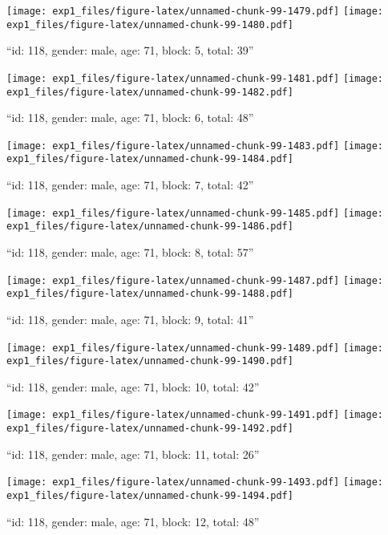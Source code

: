 \documentclass[,]{article}
\begin{document}
\texttt{[image: exp1\_files/figure-latex/unnamed-chunk-99-1479.pdf]}
\texttt{[image: exp1\_files/figure-latex/unnamed-chunk-99-1480.pdf]}

\newpage
[1] 

``id: 118, gender: male, age: 71, block: 5, total: 39''

\texttt{[image: exp1\_files/figure-latex/unnamed-chunk-99-1481.pdf]}
\texttt{[image: exp1\_files/figure-latex/unnamed-chunk-99-1482.pdf]}

\newpage
[1] 

``id: 118, gender: male, age: 71, block: 6, total: 48''

\texttt{[image: exp1\_files/figure-latex/unnamed-chunk-99-1483.pdf]}
\texttt{[image: exp1\_files/figure-latex/unnamed-chunk-99-1484.pdf]}

\newpage
[1] 

``id: 118, gender: male, age: 71, block: 7, total: 42''

\texttt{[image: exp1\_files/figure-latex/unnamed-chunk-99-1485.pdf]}
\texttt{[image: exp1\_files/figure-latex/unnamed-chunk-99-1486.pdf]}

\newpage
[1] 

``id: 118, gender: male, age: 71, block: 8, total: 57''

\texttt{[image: exp1\_files/figure-latex/unnamed-chunk-99-1487.pdf]}
\texttt{[image: exp1\_files/figure-latex/unnamed-chunk-99-1488.pdf]}

\newpage
[1] 

``id: 118, gender: male, age: 71, block: 9, total: 41''

\texttt{[image: exp1\_files/figure-latex/unnamed-chunk-99-1489.pdf]}
\texttt{[image: exp1\_files/figure-latex/unnamed-chunk-99-1490.pdf]}

\newpage
[1] 

``id: 118, gender: male, age: 71, block: 10, total: 42''

\texttt{[image: exp1\_files/figure-latex/unnamed-chunk-99-1491.pdf]}
\texttt{[image: exp1\_files/figure-latex/unnamed-chunk-99-1492.pdf]}

\newpage
[1] 

``id: 118, gender: male, age: 71, block: 11, total: 26''

\texttt{[image: exp1\_files/figure-latex/unnamed-chunk-99-1493.pdf]}
\texttt{[image: exp1\_files/figure-latex/unnamed-chunk-99-1494.pdf]}

\newpage
[1] 

``id: 118, gender: male, age: 71, block: 12, total: 48''
\end{document}
